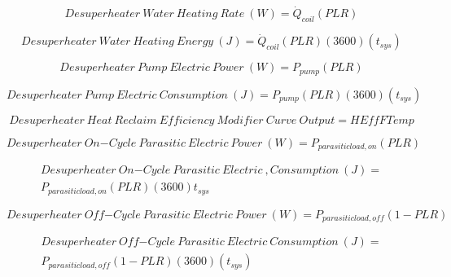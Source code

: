 \begin{equation}
Desuperheater~Water~Heating~Rate~(W) = {\dot Q_{coil}}\left( {PLR} \right)
\end{equation}

\begin{equation}
Desuperheater~Water~Heating~Energy~(J) = {\dot Q_{coil}}\left( {PLR} \right)(3600)\left( {{t_{sys}}} \right)
\end{equation}

\begin{equation}
Desuperheater~Pump~Electric~Power~(W) = {P_{pump}}\left( {PLR} \right)
\end{equation}

\begin{equation}
Desuperheater~Pump~Electric~Consumption~(J) = {P_{pump}}\left( {PLR} \right)\left( {3600} \right)\left( {{t_{sys}}} \right)
\end{equation}

\begin{equation}
Desuperheater~Heat~Reclaim~Efficiency~Modifier~Curve~Output = HEffFTemp
\end{equation}

\begin{equation}
Desuperheater~On{\mathrm{ - }}Cycle~Parasitic~Electric~Power~(W) = {P_{parasiticload,on}}\left( {PLR} \right)
\end{equation}

\begin{equation}
\begin{split}
Desuperheater~On{\mathrm{ - }}Cycle~Parasitic~Electric~,Consumption~(J) = \\{P_{parasiticload,on}}\left( {PLR} \right)\left( {3600} \right){t_{sys}}
\end{split}
\end{equation}

\begin{equation}
Desuperheater~Off{\mathrm{ - }}Cycle~Parasitic~Electric~Power~(W) = {P_{parasiticload,off}}\left( {1 - PLR} \right)
\end{equation}

\begin{equation}
\begin{split}
Desuperheater~Off{\mathrm{ - }}Cycle~Parasitic~Electric~Consumption~(J) = \\{P_{parasiticload,off}}\left( {1 - PLR} \right)\left( {3600} \right)\left( {{t_{sys}}} \right)
\end{split}
\end{equation}

